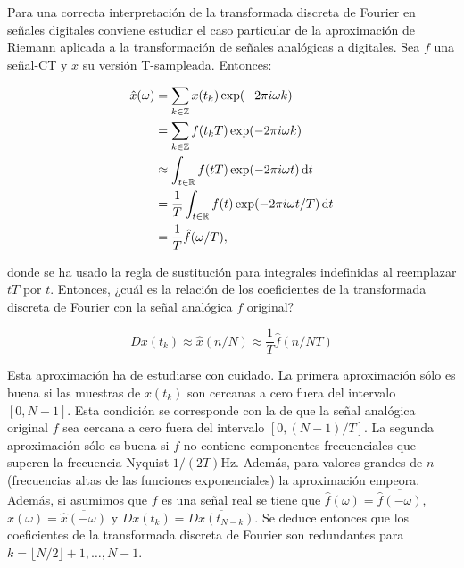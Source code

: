 \documentclass{article}
\begin{document}
Para una correcta interpretación de la transformada discreta de Fourier en señales digitales conviene estudiar el caso particular de la aproximación de Riemann aplicada a la transformación de señales analógicas a digitales. Sea $f$ una señal-CT y $x$ su versión T-sampleada. Entonces:

\begin{equation}
    \begin{split}
        \hat{x}(\omega) &= \sum_{k\in\mathbb{Z}}x(t_k)\exp(-2\pi i\omega k) \\
        & = \sum_{k\in\mathbb{Z}}f(t_kT)\exp(-2\pi i\omega k) \\
        & \approx \int_{t\in\mathbb{R}}f(tT)\exp(-2\pi i\omega t)\,\mathrm{d} t \\
        & = \frac{1}{T}\int_{t\in\mathbb{R}}f(t)\exp(-2\pi i\omega t/T)\,\mathrm{d} t \\
        & = \frac{1}{T}\hat{f}(\omega/T), 
    \end{split}
\end{equation}

donde se ha usado la regla de sustitución para integrales indefinidas al reemplazar $tT$ por $t$.\newline
Entonces, ¿cuál es la relación de los coeficientes de la transformada discreta de Fourier con la señal analógica $f$ original?

\begin{equation}\label{eq:DT-CT-approx}
    Dx(t_k) \approx \hat{x}(n/N) \approx \frac{1}{T}\hat{f}(n/NT)
\end{equation}

Esta aproximación ha de estudiarse con cuidado. La primera aproximación sólo es buena si las muestras de $x(t_k)$ son cercanas a cero fuera del intervalo $[0, N-1]$. Esta condición se corresponde con la de que la señal analógica original $f$ sea cercana a cero fuera del intervalo $[0,(N-1)/T]$. La segunda aproximación sólo es buena si $f$ no contiene componentes frecuenciales que superen la frecuencia Nyquist $1/(2T)$Hz. Además, para valores grandes de $n$ (frecuencias altas de las funciones exponenciales) la aproximación empeora. Además, si asumimos que $f$ es una señal real se tiene que $\hat{f}(\omega)=\overline{\hat{f}(-\omega)}$, $\hat{x}(\omega)=\overline{\hat{x}(-\omega)}$ y $Dx(t_k)=\overline{Dx(t_{N-k})}$. Se deduce entonces que los coeficientes de la transformada discreta de Fourier son redundantes para $k=\lfloor N/2\rfloor+1,\dots,N-1$.
\end{document}
